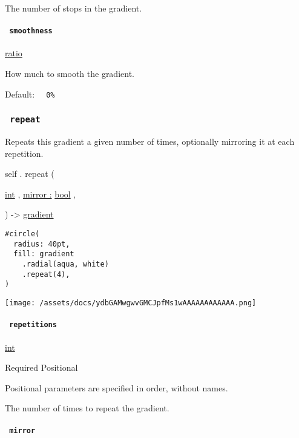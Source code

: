 The number of stops in the gradient.

\paragraph{\texorpdfstring{\texttt{\ smoothness\ }}{ smoothness }}\label{definitions-sharp-smoothness}

\href{/docs/reference/layout/ratio/}{ratio}

How much to smooth the gradient.

Default: \texttt{\ }{\texttt{\ 0\%\ }}\texttt{\ }

\subsubsection{\texorpdfstring{\texttt{\ repeat\ }}{ repeat }}\label{definitions-repeat}

Repeats this gradient a given number of times, optionally mirroring it
at each repetition.

self { . } { repeat } (

{ \href{/docs/reference/foundations/int/}{int} , } {
\hyperref[definitions-repeat-parameters-mirror]{mirror :}
\href{/docs/reference/foundations/bool/}{bool} , }

) -\textgreater{} \href{/docs/reference/visualize/gradient/}{gradient}

\begin{verbatim}
#circle(
  radius: 40pt,
  fill: gradient
    .radial(aqua, white)
    .repeat(4),
)
\end{verbatim}

\texttt{[image: /assets/docs/ydbGAMwgwvGMCJpfMs1wAAAAAAAAAAAA.png]}

\paragraph{\texorpdfstring{\texttt{\ repetitions\ }}{ repetitions }}\label{definitions-repeat-repetitions}

\href{/docs/reference/foundations/int/}{int}

{Required} {{ Positional }}

\label{definitions-repeat-repetitions-positional-tooltip}
Positional parameters are specified in order, without names.

The number of times to repeat the gradient.

\paragraph{\texorpdfstring{\texttt{\ mirror\ }}{ mirror }}\label{definitions-repeat-mirror}

